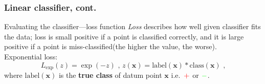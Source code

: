 \documentclass{beamer}
\begin{document}
  \begin{frame}
    \frametitle{Linear classifier, cont.}
    \begin{block}{Evaluating the classifier---loss function}
      \textit{Loss} describes how well given classifier fits the data; loss is small positive if a point is classified correctly, and it is large positive if a point is miss-classified(the higher the value, the worse).\\
      Exponential loss:
      $$
        L_{\text{exp}}(z) = \exp(-z) \text{  ,  } z(\mathbf{x}) = \text{label}(\mathbf{x}) * \text{class}(\mathbf{x}) \text{ ,}
      $$
      where $\text{label}(\mathbf{x})$ is the \textbf{true class} of datum point $\mathbf{x}$ i.e.\ $\textcolor{red}{+}$ or $\textcolor{green}{-}$.
    \end{block}
  \end{frame}
\end{document}
